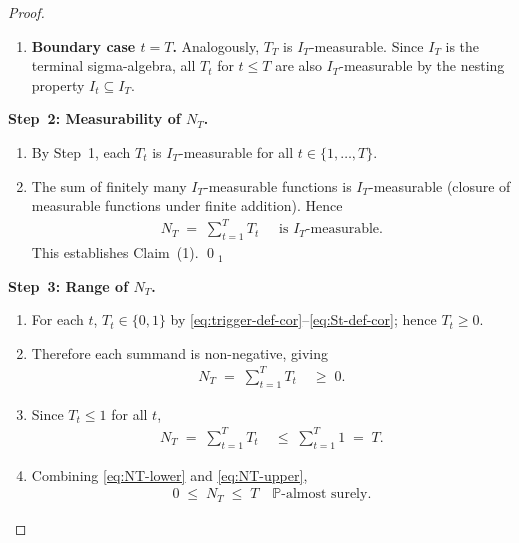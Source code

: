 \documentclass[12pt,openany]{book}
\numberwithin{equation}{chapter}
\theoremstyle{plain}
\theoremstyle{definition}
\theoremstyle{remark}
\def\mathcal#1{#1}%
\begin{document}
\begin{proof}
\begin{enumerate}
  \item \textbf{Boundary case $t = T$.}  Analogously, $T_T$ is
        $\mathcal{I}_T$-measurable.  Since $\mathcal{I}_T$ is the terminal
        sigma-algebra, all $T_t$ for $t \leq T$ are also
        $\mathcal{I}_T$-measurable by the nesting property
        $\mathcal{I}_t \subseteq \mathcal{I}_T$.
\end{enumerate}

\medskip
\noindent\textbf{Step~2: Measurability of $N_T$.}
\begin{enumerate}
  \item By Step~1, each $T_t$ is $\mathcal{I}_T$-measurable for all
        $t \in \{1,\ldots,T\}$.

  \item The sum of finitely many $\mathcal{I}_T$-measurable functions is
        $\mathcal{I}_T$-measurable (closure of measurable functions under
        finite addition).  Hence
        \begin{align}
          N_T
          \;=\; \sum_{t=1}^{T} T_t
          &\;\text{ is } \mathcal{I}_T\text{-measurable.}
          \label{eq:NT-meas}
        \end{align}
        This establishes Claim~(1). \qed$_1$
\end{enumerate}

\medskip
\noindent\textbf{Step~3: Range of $N_T$.}
\begin{enumerate}
  \item For each $t$, $T_t \in \{0,1\}$ by
        \eqref{eq:trigger-def-cor}--\eqref{eq:St-def-cor};
        hence $T_t \geq 0$.

  \item Therefore each summand is non-negative, giving
        \begin{align}
          N_T
          \;=\; \sum_{t=1}^{T} T_t
          &\;\geq\; 0.
          \label{eq:NT-lower}
        \end{align}

  \item Since $T_t \leq 1$ for all $t$,
        \begin{align}
          N_T
          \;=\; \sum_{t=1}^{T} T_t
          &\;\leq\; \sum_{t=1}^{T} 1 \;=\; T.
          \label{eq:NT-upper}
        \end{align}

  \item Combining \eqref{eq:NT-lower} and \eqref{eq:NT-upper},
        \begin{align}
          0 \;\leq\; N_T \;\leq\; T
          \quad \mathbb{P}\text{-almost surely.}
          \label{eq:NT-range}
        \end{align}


\end{enumerate}
\end{proof}
\end{document}
